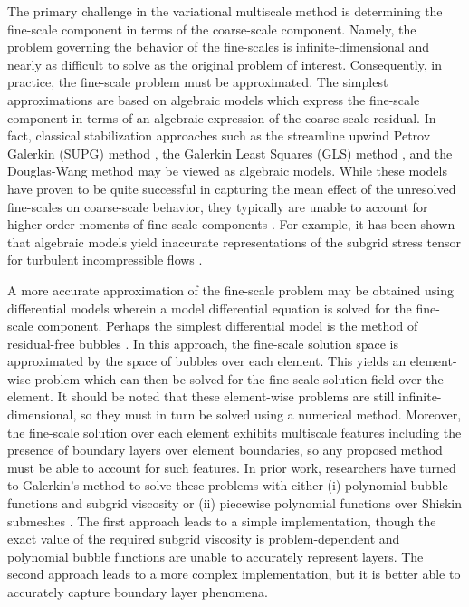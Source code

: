 \documentclass[11pt]{article}
\begin{document}
The primary challenge in the variational multiscale method is determining the fine-scale component in terms of the coarse-scale component.  Namely, the problem governing the behavior of the fine-scales is infinite-dimensional and nearly as difficult to solve as the original problem of interest.  Consequently,  in practice, the fine-scale problem must be approximated.  The simplest approximations are based on algebraic models which express the fine-scale component in terms of an algebraic expression of the coarse-scale residual.  In fact, classical stabilization approaches such as the streamline upwind Petrov Galerkin (SUPG) method \cite{Brooks82}, the Galerkin Least Squares (GLS) method \cite{Hughes86,Hughes89}, and the Douglas-Wang method \cite{Douglas89} may be viewed as algebraic models.  While these models have proven to be quite successful in capturing the mean effect of the unresolved fine-scales on coarse-scale behavior, they typically are unable to account for higher-order moments of fine-scale components \cite{Calo05}.  For example, it has been shown that algebraic models yield inaccurate representations of the subgrid stress tensor for turbulent incompressible flows \cite{Wang10}.

A more accurate approximation of the fine-scale problem may be obtained using differential models wherein a model differential equation is solved for the fine-scale component.  Perhaps the simplest differential model is the method of residual-free bubbles \cite{Brezzi92,Brezzi97,Brezzi94,Brezzi02,Sangalli03}.  In this approach, the fine-scale solution space is approximated by the space of bubbles over each element.  This yields an element-wise problem which can then be solved for the fine-scale solution field over the element.  It should be noted that these element-wise problems are still infinite-dimensional, so they must in turn be solved using a numerical method.  Moreover, the fine-scale solution over each element exhibits multiscale features including the presence of boundary layers over element boundaries, so any proposed method must be able to account for such features.  In prior work, researchers have turned to Galerkin's method to solve these problems with either (i) polynomial bubble functions and subgrid viscosity \cite{Brezzi00,Guermond99} or (ii) piecewise polynomial functions over Shiskin submeshes \cite{Brezzi03,Brezzi98}.  The first approach leads to a simple implementation, though the exact value of the required subgrid viscosity is problem-dependent and polynomial bubble functions are unable to accurately represent layers.  The second approach leads to a more complex implementation, but it is better able to accurately capture boundary layer phenomena.
\end{document}
